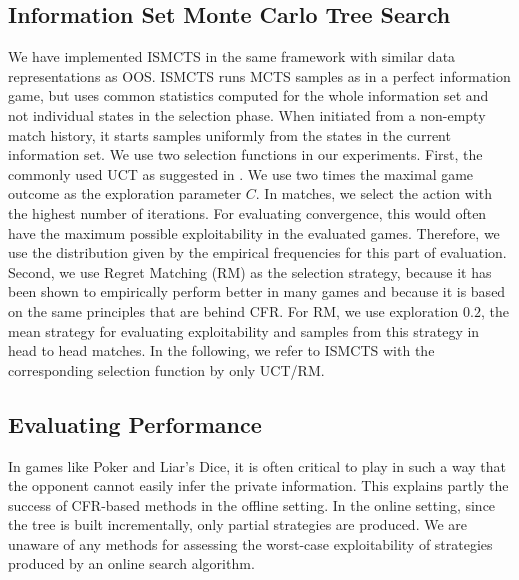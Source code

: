 \documentclass{aamas2015}
\begin{document}
\subsection{Information Set Monte Carlo Tree Search}
We have implemented ISMCTS in the same framework with similar data representations as OOS. ISMCTS runs MCTS samples as in a perfect information game, but uses common statistics computed for the whole information set and not individual states in the selection phase. When initiated from a non-empty match history, it starts samples uniformly from the states in the current information set. We use two selection functions in our experiments. First, the commonly used UCT as suggested in \cite{Cowling12ISMCTS}. We use two times the maximal game outcome as the exploration parameter $C$. In matches, we select the action with the highest number of iterations. For evaluating convergence, this would often have the maximum possible exploitability in the evaluated games. Therefore, we use the distribution given by the empirical frequencies for this part of evaluation. Second, we use Regret Matching (RM) as the selection strategy, because it has been shown to empirically perform better in many games \cite{Lisy14selection} and because it is based on the same principles that are behind CFR. For RM, we use exploration $0.2$, the mean strategy for evaluating exploitability and samples from this strategy in head to head matches. In the following, we refer to ISMCTS with the corresponding selection function by only UCT/RM.

\subsection{Evaluating Performance}\label{sec:evaluating}

In games like Poker and Liar's Dice, it is often critical to play in such a way that the opponent 
cannot easily infer the private information. This explains partly 
the success of CFR-based methods in the offline setting. 
In the online setting, since the tree is built incrementally, only partial strategies
are produced. 
We are unaware of any methods for assessing the worst-case exploitability of strategies 
produced by an online search algorithm. 
\end{document}

